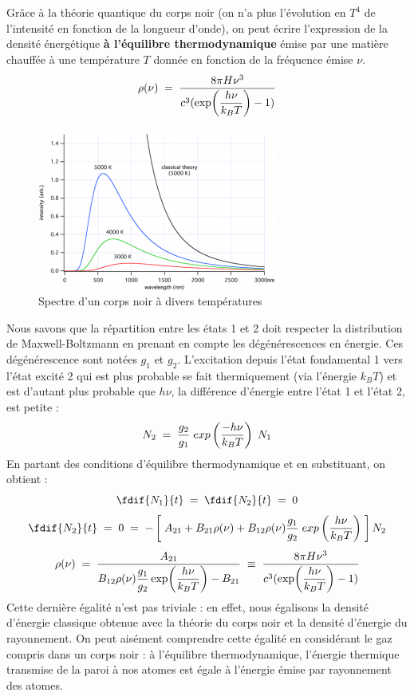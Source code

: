 Grâce à la théorie quantique du corps noir (on n'a plus l'évolution en $T^4$ de l'intensité en fonction de la longueur d'onde), on peut écrire l'expression de la densité énergétique \textbf{à l'équilibre thermodynamique} émise par une matière chauffée à une température $T$ donnée en fonction de la fréquence émise $\nu$.
\begin{equation}
    \rho(\nu) \; = \; \dfrac{8\pi H \nu^3}{c^3(\exp(\dfrac{h\nu}{k_BT})-1)}
\end{equation}
\begin{figure}[tph]
    \centering
    \includegraphics[scale=1.1]{Images2/corps_noir.png}
    \caption{Spectre d'un corps noir à divers températures}
    \label{fig : Corps noir}
\end{figure}
Nous savons que la répartition entre les états 1 et 2 doit respecter la distribution de Maxwell-Boltzmann en prenant en compte les dégénérescences en énergie. Ces dégénérescence sont notées $g_1$ et $g_2$. L'excitation depuis l'état fondamental 1 vers l'état excité 2 qui est plus probable se fait thermiquement (via l'énergie $k_BT$) et est d'autant plus probable que $h\nu$, la différence d'énergie entre l'état 1 et l'état 2, est petite :
\[
    N_2 \; = \; \dfrac{g_2}{g_1} \; exp\left(\dfrac{-h\nu}{k_BT}\right) \;N_1
\]
En partant des conditions d'équilibre thermodynamique et en substituant, on obtient :
\[
    \fdif{N_1}{t} \eq \fdif{N_2}{t} \eq 0
\]
\[
    \fdif{N_2}{t} 
    \eq 0 
    \eq - \left[\;A_{21} + B_{21} \rho(\nu) + B_{12}\rho(\nu) \dfrac{g_1}{g_2} \; exp\left(\dfrac{h\nu}{k_BT}\right) \;\right] N_2
\]
\[
    \rho(\nu) 
    \; = \; \dfrac{A_{21}}{B_{12}\rho(\nu) \dfrac{g_1}{g_2} \exp(\dfrac{h\nu}{k_BT}) - B_{21}}
    \;\equiv\; \dfrac{8\pi H \nu^3}{c^3(\exp(\dfrac{h\nu}{k_BT})-1)}
\]
Cette dernière égalité n'est pas triviale : en effet, nous égalisons la densité d'énergie classique obtenue avec la théorie du corps noir et la densité d'énergie du rayonnement. On peut aisément comprendre cette égalité en considérant le gaz compris dans un corps noir : à l'équilibre thermodynamique, l'énergie thermique transmise de la paroi à nos atomes est égale à l'énergie émise par rayonnement des atomes.\\
